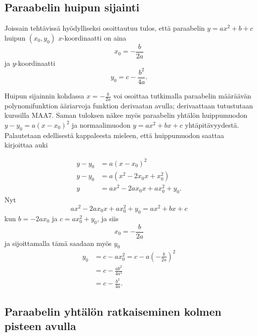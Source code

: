 
\subsection*{Paraabelin huipun sijainti}
Joissain tehtävissä hyödylliseksi osoittautuu tulos, että paraabelin $y = ax^2 +b +c$ huipun $(x_0, y_0)$ $x$-koordinaatti on aina
\[x_0 = - \frac{b}{2a}\]
ja $y$-koordinaatti
\[y_0 = c - \frac{b^2}{4a}.\]


Huipun sijainnin kohdassa $x = - \frac{b}{2a}$ voi osoittaa tutkimalla paraabelin määräävän polynomifunktion ääriarvoja funktion derivaatan avulla; derivaattaan tutustutaan kurssilla MAA7. Saman tuloksen näkee myös paraabelin yhtälön huippumuodon $y - y_0 = a(x- x_0)^2$ ja normaalimuodon $y = ax^2 +bx +c$ yhtäpitävyydestä. Palautetaan edellisestä kappaleesta mieleen, että huippumuodon saattaa kirjoittaa auki

\begin{align*}
y-y_0 &= a(x-x_0)^2 \\
y-y_0 &= a(x^2 - 2x_0x + x_0^2) \\
y &= ax^2 - 2ax_0 x + ax_0^2 +y_0.
\end{align*}
Nyt
\[ax^2 - 2ax_0 x + ax_0^2 +y_0 = ax^2 +bx +c\]
kun $b = -2ax_0$ ja $c = ax_0^2 +y_0$, ja siis
\[x_0 = -\frac{b}{2a}\]
ja sijoittamalla tämä saadaan myös $y_0$
\begin{align*}
y_0 &= c - ax_0^2 = c -a\left(-\frac{b}{2a}\right)^2 \\
&= c - \frac{ab^2}{4a^2} \\
&= c - \frac{b^2}{4a}.
\end{align*}

\subsection*{Paraabelin yhtälön ratkaiseminen kolmen pisteen avulla}

